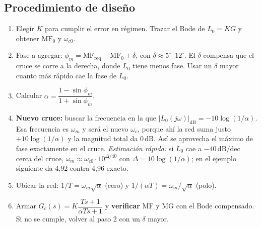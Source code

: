 \documentclass[11pt,a4paper]{article}
\newcounter{ejemplo}
\newcommand{\dB}{\,\mathrm{dB}}
\newcommand{\dBdec}{\,\mathrm{dB/dec}}
\newcommand{\jw}{j\omega}
\newcommand{\MF}{\mathrm{MF}}
\newcommand{\wc}{\omega_c}
\begin{document}
\subsection{Procedimiento de diseño}
\begin{receta}
\begin{enumerate}[label=\textbf{\arabic*.}]
\item Elegir $K$ para cumplir el error en régimen. Trazar el Bode de $L_0=KG$ y obtener $\MF_0$ y $\omega_{c0}$.
\item Fase a agregar: $\phi_m=\MF_{\text{req}}-\MF_0+\delta$, con $\delta\approx5^\circ$--$12^\circ$. El $\delta$ compensa que el cruce
      se corre a la derecha, donde $L_0$ tiene menos fase. Usar un $\delta$ mayor cuanto más rápido cae la fase de $L_0$.
\item Calcular $\alpha=\dfrac{1-\sin\phi_m}{1+\sin\phi_m}$.
\item \textbf{Nuevo cruce:} buscar la frecuencia en la que $|L_0(\jw)|_{\mathrm{dB}}=-10\log(1/\alpha)$. Esa frecuencia es $\omega_m$
      y será el nuevo $\wc$, porque ahí la red suma justo $+10\log(1/\alpha)$ y la magnitud total da $0\dB$.
      Así se aprovecha el máximo de fase exactamente en el cruce. \emph{Estimación rápida:} si $L_0$ cae a $-40\dBdec$ cerca del cruce,
      $\omega_m\approx\omega_{c0}\cdot10^{\Delta/40}$ con $\Delta=10\log(1/\alpha)$; en el ejemplo siguiente da 4,92 contra 4,96 exacto.
\item Ubicar la red: $1/T=\omega_m\sqrt\alpha$ (cero) y $1/(\alpha T)=\omega_m/\sqrt\alpha$ (polo).
\item Armar $G_c(s)=K\dfrac{Ts+1}{\alpha Ts+1}$ y \textbf{verificar} MF y MG con el Bode compensado.
      Si no se cumple, volver al paso 2 con un $\delta$ mayor.
\end{enumerate}
\end{receta}
\end{document}

